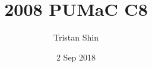 \documentclass[a4paper, 12pt]{article}
\title{2008 PUMaC C8}
\author{Tristan Shin}
\date{2 Sep 2018}
\begin{document}
\maketitle



\hrulefill

\begin{solution}

\end{solution}
\end{document}
